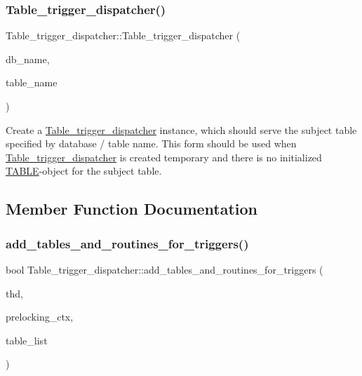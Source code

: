 \subsubsection{\texorpdfstring{Table\+\_\+trigger\+\_\+dispatcher()}{Table\_trigger\_dispatcher()}}
{\footnotesize\ttfamily Table\+\_\+trigger\+\_\+dispatcher\+::\+Table\+\_\+trigger\+\_\+dispatcher (\begin{DoxyParamCaption}\item[{const char $\ast$}]{db\+\_\+name,  }\item[{const char $\ast$}]{table\+\_\+name }\end{DoxyParamCaption})}

Create a \mbox{\hyperlink{classTable__trigger__dispatcher}{Table\+\_\+trigger\+\_\+dispatcher}} instance, which should serve the subject table specified by database / table name. This form should be used when \mbox{\hyperlink{classTable__trigger__dispatcher}{Table\+\_\+trigger\+\_\+dispatcher}} is created temporary and there is no initialized \mbox{\hyperlink{structTABLE}{T\+A\+B\+LE}}-\/object for the subject table. 

\subsection{Member Function Documentation}
\mbox{\label{classTable__trigger__dispatcher_acd9e2a58e8728a599a2345f1b157f24c}} 
\subsubsection{\texorpdfstring{add\+\_\+tables\+\_\+and\+\_\+routines\+\_\+for\+\_\+triggers()}{add\_tables\_and\_routines\_for\_triggers()}}
{\footnotesize\ttfamily bool Table\+\_\+trigger\+\_\+dispatcher\+::add\+\_\+tables\+\_\+and\+\_\+routines\+\_\+for\+\_\+triggers (\begin{DoxyParamCaption}\item[{T\+HD $\ast$}]{thd,  }\item[{Query\+\_\+tables\+\_\+list $\ast$}]{prelocking\+\_\+ctx,  }\item[{\mbox{\hyperlink{structTABLE__LIST}{T\+A\+B\+L\+E\+\_\+\+L\+I\+ST}} $\ast$}]{table\+\_\+list }\end{DoxyParamCaption})}

